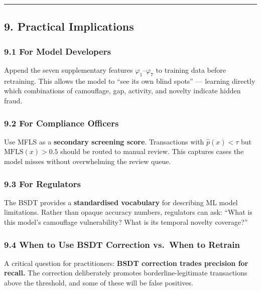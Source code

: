 \documentclass[
  11pt,
]{article}
\begin{document}
\begin{center}\rule{0.5\linewidth}{0.5pt}\end{center}

\subsection{9. Practical Implications}\label{practical-implications}

\subsubsection{9.1 For Model Developers}\label{for-model-developers}

Append the seven supplementary features \(\varphi_1\)–\(\varphi_7\) to
training data before retraining. This allows the model to “see its own
blind spots” — learning directly which combinations of camouflage, gap,
activity, and novelty indicate hidden fraud.

\subsubsection{9.2 For Compliance
Officers}\label{for-compliance-officers}

Use MFLS as a \textbf{secondary screening score}. Transactions with
\(\hat{p}(x) < \tau\) but \(\text{MFLS}(x) > 0.5\) should be routed to
manual review. This captures cases the model misses without overwhelming
the review queue.

\subsubsection{9.3 For Regulators}\label{for-regulators}

The BSDT provides a \textbf{standardised vocabulary} for describing ML
model limitations. Rather than opaque accuracy numbers, regulators can
ask: “What is this model’s camouflage vulnerability? What is its
temporal novelty coverage?”

\subsubsection{9.4 When to Use BSDT Correction vs.~When to
Retrain}\label{when-to-use-bsdt-correction-vs.-when-to-retrain}

A critical question for practitioners: \textbf{BSDT correction trades
precision for recall.} The correction deliberately promotes
borderline-legitimate transactions above the threshold, and some of
these will be false positives.
\end{document}
